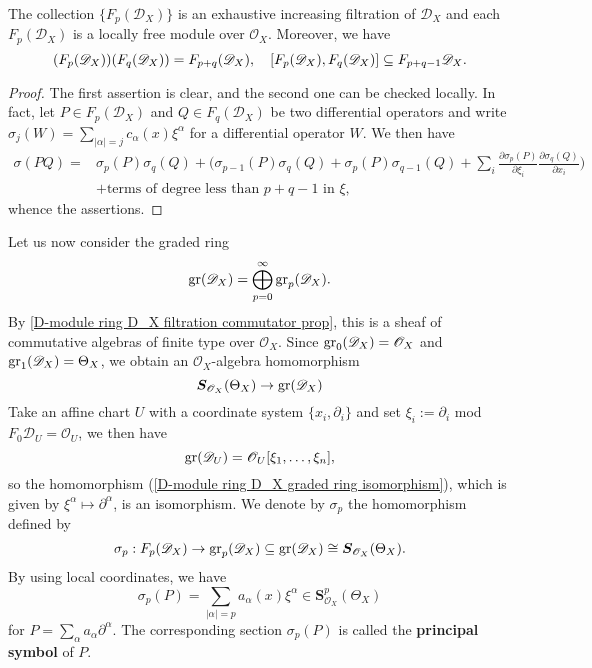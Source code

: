\begin{proposition}\label{D-module ring D_X filtration commutator prop}
The collection $\{F_p(\mathscr{D}_X)\}$ is an exhaustive increasing filtration of $\mathscr{D}_X$ and each $F_p(\mathscr{D}_X)$ is a locally free module over $\mathscr{O}_X$. Moreover, we have
\[(F_p(\mathscr{D}_X))(F_q(\mathscr{D}_X))=F_{p+q}(\mathscr{D}_X),\quad [F_p(\mathscr{D}_X),F_q(\mathscr{D}_X)]\subseteq F_{p+q-1}\mathscr{D}_X.\]
\end{proposition}
\begin{proof}
The first assertion is clear, and the second one can be checked locally. In fact, let $P\in F_p(\mathscr{D}_X)$ and $Q\in F_q(\mathscr{D}_X)$ be two differential operators and write $\sigma_j(W)=\sum_{|\alpha|=j}c_\alpha(x)\xi^\alpha$ for a differential operator $W$. We then have
\begin{equation}\label{D-module ring D_X filtration commutator prop-1}
\begin{aligned}
\sigma(PQ)=&\sigma_p(P)\sigma_q(Q)+\Big(\sigma_{p-1}(P)\sigma_q(Q)+\sigma_p(P)\sigma_{q-1}(Q)+\sum_i\frac{\partial \sigma_p(P)}{\partial\xi_i}\frac{\partial \sigma_q(Q)}{\partial x_i}\Big)\\
&+\text{terms of degree less than $p+q-1$ in $\xi$},
\end{aligned}
\end{equation}
whence the assertions.
\end{proof}

Let us now consider the graded ring
\[\mathrm{gr}(\mathscr{D}_X)=\bigoplus_{p=0}^{\infty}\mathrm{gr}_p(\mathscr{D}_X).\]
By \cref{D-module ring D_X filtration commutator prop}, this is a sheaf of commutative algebras of finite type over $\mathscr{O}_X$. Since $\mathrm{gr}_0(\mathscr{D}_X)=\mathscr{O}_X$ and $\mathrm{gr}_1(\mathscr{D}_X)=\Theta_X$, we obtain an $\mathscr{O}_X$-algebra homomorphism
\begin{equation}\label{D-module ring D_X graded ring isomorphism}
\bm{S}_{\mathscr{O}_X}(\Theta_X)\to\mathrm{gr}(\mathscr{D}_X)
\end{equation}
Take an affine chart $U$ with a coordinate system $\{x_i,\partial_i\}$ and set $\xi_i:=\partial_i$ mod $F_0\mathscr{D}_U=\mathscr{O}_U$, we then have
\[\mathrm{gr}(\mathscr{D}_U)=\mathscr{O}_U[\xi_1,\dots,\xi_n],\]
so the homomorphism (\ref{D-module ring D_X graded ring isomorphism}), which is given by $\xi^\alpha\mapsto\partial^\alpha$, is an isomorphism. We denote by $\sigma_p$ the homomorphism defined by
\[\sigma_p:F_p(\mathscr{D}_X)\to \mathrm{gr}_p(\mathscr{D}_X)\subseteq \mathrm{gr}(\mathscr{D}_X)\cong \bm{S}_{\mathscr{O}_X}(\Theta_X).\]
By using local coordinates, we have
\[\sigma_p(P)=\sum_{|\alpha|=p}a_\alpha(x)\xi^\alpha\in \bm{S}_{\mathscr{O}_X}^p(\Theta_X)\]
for $P=\sum_\alpha a_\alpha\partial^\alpha$. The corresponding section $\sigma_p(P)$ is called the \textbf{principal symbol} of $P$.

